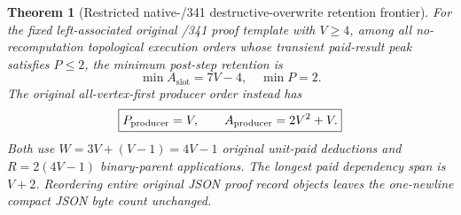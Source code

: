 \documentclass[11pt]{article}
\newtheorem{theorem}{Theorem}
\begin{document}
\begin{theorem}[Restricted native-/341 destructive-overwrite retention frontier]
For the fixed left-associated original /341 proof template with $V\ge4$, among all no-recomputation topological execution orders whose transient paid-result peak satisfies $P\le 2$, the minimum post-step retention is
\[
\boxed{\min A_{\mathrm{slot}}=7V-4,\quad \min P=2.}
\]
The original all-vertex-first producer order instead has
\[
\boxed{P_{\rm producer}=V,\qquad A_{\rm producer}=2V^2+V.}
\]
Both use $W=3V+(V-1)=4V-1$ original unit-paid deductions and $R=2(4V-1)$ binary-parent applications. The longest paid dependency span is $V+2$. Reordering entire original JSON proof record objects leaves the one-newline compact JSON byte count unchanged.
\end{theorem}
\end{document}
